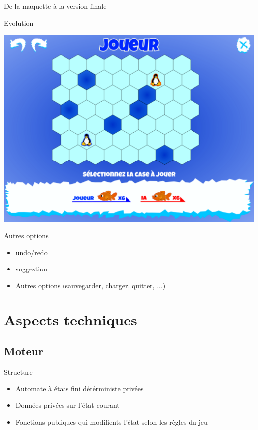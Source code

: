 \documentclass{beamer}
\begin{document}
\begin{frame}{De la maquette à la version finale}
\begin{frame}{Evolution}
    \begin{center}
      \includegraphics[scale=0.25]{ancienPlateau}
    \end{center}
\end{frame}

\begin{frame}{}
  \begin{block}{Autres options}
    \begin{itemize}
    \item <1-> undo/redo
    \item <2-> suggestion
    \item <3-> Autres options (sauvegarder, charger, quitter, ...)
    \end{itemize}
  \end{block}
\end{frame}

\section{Aspects techniques}


\subsection{Moteur}

\begin{frame}{Structure}
\begin{block}{}
\begin{itemize}
\item<1-> Automate à états fini détérministe privées
\item<2-> Données privées sur l'état courant
\item<3-> Fonctions publiques qui modifients l'état selon les règles du jeu
\end{itemize}
\end{block}
\end{frame}


\end{frame}
\end{document}
